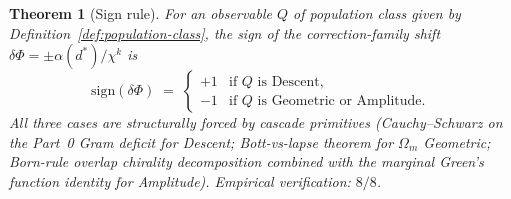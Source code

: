 \documentclass[12pt,a4paper]{article}
\newtheorem{theorem}{Theorem}[section]
\begin{document}
\begin{theorem}[Sign rule]\label{thm:sign-rule}
For an observable $Q$ of population class given by
Definition~\ref{def:population-class}, the sign of the correction-family
shift $\delta\Phi=\pm\alpha(d^*)/\chi^k$ is
\[
\mathrm{sign}(\delta\Phi)
\;=\;
\begin{cases}
+1 & \text{if $Q$ is Descent,}\\
-1 & \text{if $Q$ is Geometric or Amplitude.}
\end{cases}
\]
All three cases are structurally forced by cascade primitives
(Cauchy--Schwarz on the Part~0 Gram deficit for Descent; Bott-vs-lapse
theorem for $\Omega_m$ Geometric; Born-rule overlap chirality
decomposition combined with the marginal Green's function identity
for Amplitude). Empirical verification: $8/8$.
\end{theorem}
\end{document}
